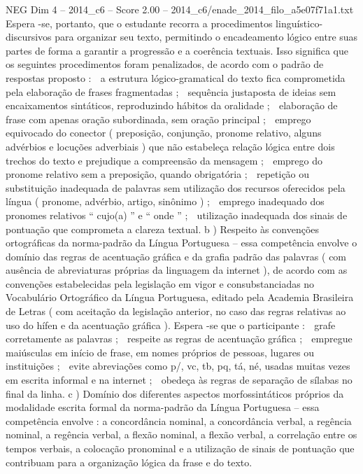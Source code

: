 \begin{textsample}{NEG Dim 4 – 2014\_c6 – Score 2.00 – 2014\_c6/enade\_2014\_filo\_a5e07f71a1.txt}
Espera -se, portanto, que o estudante recorra a procedimentos linguístico-discursivos para organizar seu texto, permitindo o encadeamento lógico entre suas partes de forma a garantir a progressão e a coerência textuais.
Isso significa que os seguintes procedimentos foram penalizados, de acordo com o padrão de respostas proposto :  a estrutura lógico-gramatical do texto fica comprometida pela elaboração de frases fragmentadas ;  sequência justaposta de ideias sem encaixamentos sintáticos, reproduzindo hábitos da oralidade ;  elaboração de frase com apenas oração subordinada, sem oração principal ;  emprego equivocado do conector ( preposição, conjunção, pronome relativo, alguns advérbios e locuções adverbiais ) que não estabeleça relação lógica entre dois trechos do texto e prejudique a compreensão da mensagem ;  emprego do pronome relativo sem a preposição, quando obrigatória ;  repetição ou substituição inadequada de palavras sem utilização dos recursos oferecidos pela língua ( pronome, advérbio, artigo, sinônimo ) ;  emprego inadequado dos pronomes relativos “ cujo(a) ” e “ onde ” ;  utilização inadequada dos sinais de pontuação que comprometa a clareza textual. b ) Respeito às convenções ortográficas da norma-padrão da Língua Portuguesa – essa competência envolve o domínio das regras de acentuação gráfica e da grafia padrão das palavras ( com ausência de abreviaturas próprias da linguagem da internet ), de acordo com as convenções estabelecidas pela legislação em vigor e consubstanciadas no Vocabulário Ortográfico da Língua Portuguesa, editado pela Academia Brasileira de Letras ( com aceitação da legislação anterior, no caso das regras relativas ao uso do hífen e da acentuação gráfica ).
Espera -se que o participante :  grafe corretamente as palavras ;  respeite as regras de acentuação gráfica ;  empregue maiúsculas em início de frase, em nomes próprios de pessoas, lugares ou instituições ;  evite abreviações como p/, vc, tb, pq, tá, né, usadas muitas vezes em escrita informal e na internet ;  obedeça às regras de separação de sílabas no final da linha. c ) Domínio dos diferentes aspectos morfossintáticos próprios da modalidade escrita formal da norma-padrão da Língua Portuguesa – essa competência envolve : a concordância nominal, a concordância verbal, a regência nominal, a regência verbal, a flexão nominal, a flexão verbal, a correlação entre os tempos verbais, a colocação pronominal e a utilização de sinais de pontuação que contribuam para a organização lógica da frase e do texto.

\end{textsample}
